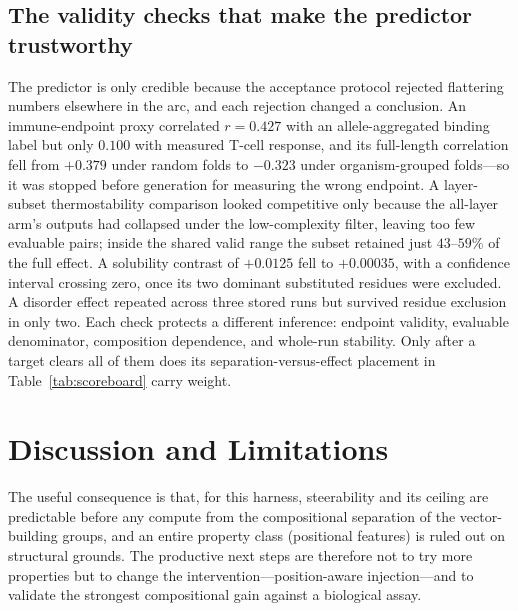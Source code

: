 \documentclass{article}
\begin{document}
\subsection{The validity checks that make the predictor trustworthy}

The predictor is only credible because the acceptance protocol rejected
flattering numbers elsewhere in the arc, and each rejection changed a
conclusion. An immune-endpoint proxy correlated $r=0.427$ with an
allele-aggregated binding label but only $0.100$ with measured T-cell response,
and its full-length correlation fell from $+0.379$ under random folds to
$-0.323$ under organism-grouped folds---so it was stopped before generation for
measuring the wrong endpoint. A layer-subset thermostability comparison looked
competitive only because the all-layer arm's outputs had collapsed under the
low-complexity filter, leaving too few evaluable pairs; inside the shared valid
range the subset retained just $43$--$59\%$ of the full effect. A solubility
contrast of $+0.0125$ fell to $+0.00035$, with a confidence interval crossing
zero, once its two dominant substituted residues were excluded. A disorder
effect repeated across three stored runs but survived residue exclusion in only
two. Each check protects a different inference: endpoint validity, evaluable
denominator, composition dependence, and whole-run stability. Only after a
target clears all of them does its separation-versus-effect placement in
Table~\ref{tab:scoreboard} carry weight.

\section{Discussion and Limitations}
\label{sec:limitations}

The useful consequence is that, for this harness, steerability and its ceiling
are predictable before any compute from the compositional separation of the
vector-building groups, and an entire property class (positional features) is
ruled out on structural grounds. The productive next steps are therefore not to
try more properties but to change the intervention---position-aware
injection---and to validate the strongest compositional gain against a
biological assay.
\end{document}

